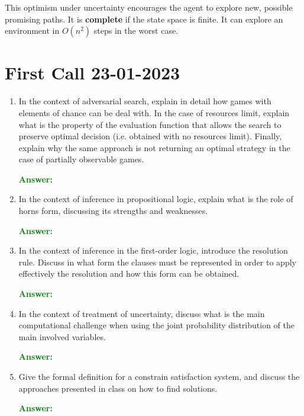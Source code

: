 \documentclass[12pt]{article}
\begin{document}
\begin{enumerate}[label=\textbf{IS.OS.\arabic*}]
\begin{itemize}
        This optimism under uncertainty encourages the agent to explore new, possible promising paths.
        It is \textbf{complete} if the state space is finite.
        It can explore an environment in $O(n^2)$ steps in the worst case.

    \end{itemize}

\end{enumerate}
\section{First Call 23-01-2023}
\begin{enumerate}[label=\textbf{A.\arabic*}]
    \item In the context of adversarial search, explain in detail how games with elements of chance can be deal with. 
    In the case of resources limit, explain what is the property of the evaluation function that allows the search to preserve optimal decision (i.e. obtained with no resources limit). 
    Finally, explain why the same approach is not returning an optimal strategy in the case of partially observable games.

    \textcolor{green}{\textbf{Answer:}}

    \item In the context of inference in propositional logic, explain what is the role of horns form, discussing its strengths and weaknesses.
    
    \textcolor{green}{\textbf{Answer:}}

    \item In the context of inference in the first-order logic, introduce the resolution rule. 
    Discuss in what form the clauses must be represented in order to apply effectively the resolution and how this form can be obtained.\label{l}

    \textcolor{green}{\textbf{Answer:}}
    
    \item In the context of treatment of uncertainty, discuss what is the main computational challenge when using the joint probability distribution of the main involved variables.
    
    \textcolor{green}{\textbf{Answer:}}

    \item Give the formal definition for a constrain satisfaction system, and discuss the approaches presented in class on how to find solutions.
    
    \textcolor{green}{\textbf{Answer:}}

\end{enumerate}
\end{document}
